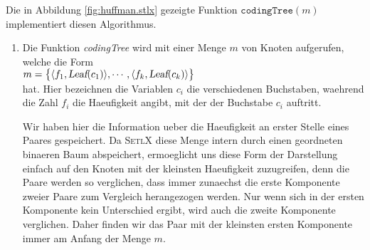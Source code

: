 \noindent
Die in Abbildung \ref{fig:huffman.stlx} gezeigte Funktion $\mathtt{codingTree}(m)$
implementiert diesen Algorithmus. 
\begin{enumerate}
\item Die Funktion \textsl{codingTree} wird mit einer Menge $m$ von Knoten aufgerufen,
      welche die Form
      \\[0.2cm]
      \hspace*{1.3cm}
      $m = \bigl\{ \langle f_1, \textsl{Leaf}(c_1) \rangle, \cdots, 
                  \langle f_k, \textsl{Leaf}(c_k) \rangle \bigr\}   
      $
      \\[0.2cm]
      hat.  Hier bezeichnen die Variablen $c_i$ die verschiedenen Buchstaben, waehrend die
      Zahl $f_i$ die Haeufigkeit angibt, mit der der Buchstabe $c_i$ auftritt.

      Wir haben hier die Information ueber die Haeufigkeit an erster Stelle eines Paares gespeichert.
      Da \textsc{SetlX} diese Menge intern durch einen geordneten binaeren Baum
      abspeichert, ermoeglicht uns diese Form der Darstellung einfach auf den Knoten mit
      der kleinsten Haeufigkeit zuzugreifen, denn die Paare werden so verglichen, dass
      immer zunaechst die erste Komponente zweier Paare zum Vergleich herangezogen werden.
      Nur wenn sich in der ersten Komponente kein Unterschied ergibt, wird auch die zweite
      Komponente verglichen.  Daher finden wir das Paar mit der kleinsten ersten
      Komponente immer am Anfang der Menge $m$.


\end{enumerate}

